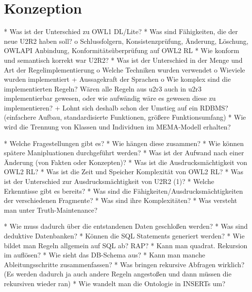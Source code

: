 \chapter{Konzeption}
    * Was ist der Unterschied zu OWL1 DL/Lite?
    * Was sind Fähigkeiten, die der neue U2R2 haben soll?
          o Schlussfolgern, Konsistenzprüfung, Änderung, Löschung, OWLAPI Anbindung, Konformitätsüberprüfung auf OWL2 RL 
    * Wie konform und semantisch korrekt war U2R2?
    * Was ist der Unterschied in der Menge und Art der Regelimplementierung
          o Welche Techniken wurden verwendet
          o Wieviele wurden implementiert
                + Aussagekraft der Sprachen 
          o Wie komplex sind die implementierten Regeln? Wären alle Regeln aus u2r3 auch in u2r3 implementierbar gewesen, oder wie aufwändig wäre es gewesen diese zu implementieren?
                + Lohnt sich deshalb schon der Umstieg auf ein RDBMS? (einfachere Aufbau, standardisierte Funktionen, größere Funktionsumfang) 
    * Wie wird die Trennung von Klassen und Individuen im MEMA-Modell erhalten?
    
    
        * Welche Fragestellungen gibt es?
    * Wie hängen diese zusammen?
    * Wie können spätere Manipluationen durchgeführt werden?
    * Was ist der Aufwand nach einer Änderung (von Fakten oder Konzepten)?
    * Was ist die Ausdrucksmächtigkeit von OWL2 RL?
    * Was ist die Zeit und Speicher Komplexität von OWL2 RL?
    * Was ist der Unterschied zur Ausdrucksmächtigkeit von U2R2 (1)?
    * Welche Erkenntisse gibt es bereits?
    * Was sind die Fähigkeiten/Ausdrucksmächtigkeiten der verschiedenen Fragmente?
    * Was sind ihre Komplexitäten?
    * Was versteht man unter Truth-Maintenance? 


    * Wie muss dadurch über die entstandenen Daten geschloßen werden?
    * Was sind deduktive Datenbanken?
    * Können die SQL Statements generiert werden?
    * Wie bildet man Regeln allgemein auf SQL ab? RAP?
    * Kann man quadrat. Rekursion im auflösen?
    * Wie sieht das DB-Schema aus?
    * Kann man manche Ableitungsschritte zusammenfassen?
    * Was bringen rekursive Abfragen wirklich? (Es werden dadurch ja auch andere Regeln angestoßen und dann müssen die rekursiven wieder ran)
    * Wie wandelt man die Ontologie in INSERTs um? 
    
     